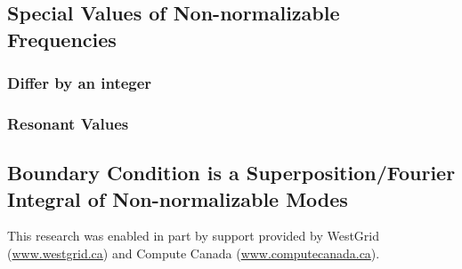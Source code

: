 \documentclass[letterpaper,11pt]{article}
\begin{document}
\subsection{Special Values of Non-normalizable Frequencies}

\subsubsection{Differ by an integer}

\subsubsection{Resonant Values}

\subsection{Boundary Condition is a Superposition/Fourier Integral of Non-normalizable Modes}

\acknowledgments

This research was enabled in part by support provided by WestGrid (\href{www.westgrid.ca}{www.westgrid.ca}) and Compute Canada (\href{www.computecanada.ca}{www.computecanada.ca}).



%

\end{document}
